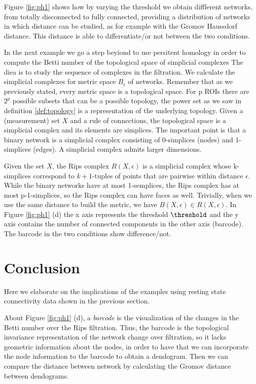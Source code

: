 \documentclass[onecollarge,runningheads]{svjour2}
\begin{document}
Figure \ref{fig:ph1} shows how by varying the threshold we obtain diffferent networks, from totally disconnected to fully connected,  providing a distribution of networks in which distance can be studied, as for example with the Gromov Haussdorf distance. This distance is able to differentiate/or not between the two conditions.

In the next example we go a step beyiond to use persitent homology in order to compute the Betti number of the topological space of simplicial complexes The diea is to study the sequence of complexes in the filtration. %
We calculate the simplicial complexes for metric space $B_\epsilon$ of networks. Remember that as
we previously stated, every metric space is a topological space.
For p ROIs there are $2^p$ possible subsets that can be a possible topology, the power set as we saw in definition \ref{def:topology} is a representation of the underlying topology.
Given a (measurement) set $X$ and a rule of connections, the topological space is a simplicial complex and its elements are simplices. %
The important point is that a binary network is a simplicial complex consisting of 0-simplices (nodes) and 1-simplices (edges). A simplicial complex admits larger dimensions.

Given the set $X$, the Rips complex $R(X,\epsilon)$ is a simplicial complex whose k-simplices correspond to $k+1$-tuples of points that are pairwise within distance $\epsilon$.
While the binary networks have at most 1-semplices, the Rips complex has at most p-1-simplices, so the Rips complex can have faces as well. Trivially, when we use the same distance to build the metric, we have $B(X,\epsilon) \in R(X,\epsilon)$.
In Figure \ref{fig:ph1} (d) the x axis represents the threshold $\threshold$ and the y axis contains the number of connected components in the other axis (barcode). The barcode in the two conditions show difference/not.

\section{Conclusion}
\label{se:conclusion}
Here we elaborate on the implications of the examples using resting state connectivity data shown in the previous section.

About Figure \ref{fig:ph1} (d), a \textit{barcode} is the visualization of the changes in the Betti number over the Rips filtration. Thus, the barcode is the topological invariance representation of the network change over filtration, so it lacks geometric information about the nodes, in order to have that we can incorporate the node information to the barcode to obtain a dendogram. Then we can compare the distance between network by calculating the Gromov distance between dendograms.
\end{document}
